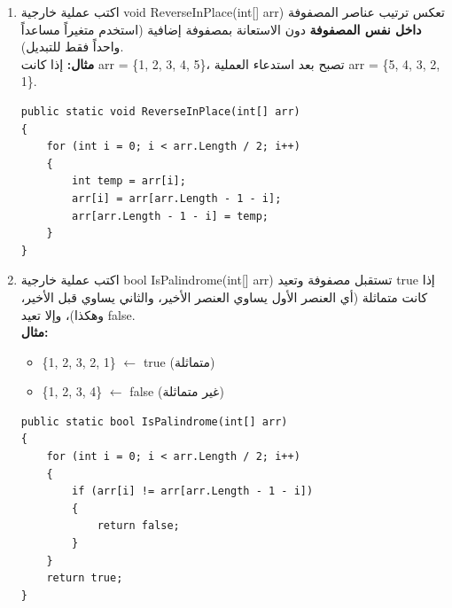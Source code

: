 \documentclass[14pt]{extarticle}
\begin{document}
\begin{enumerate}[resume, itemsep=2em]
\begin{boxSolution}
\begin{english}
\begin{verbatim}
    for (int i = arr.Length - 1; i >= 0; i--)
    {
        if (arr[i] % 2 == 0)
        {
            result[index] = arr[i];
            index++;
        }
    }

    return result;
}
    \end{verbatim}
    \end{english}
    \end{boxSolution}
    \fi

    \item
    اكتب عملية خارجية \textenglish{void ReverseInPlace(int[] arr)} تعكس ترتيب عناصر المصفوفة \textbf{داخل نفس المصفوفة} دون الاستعانة بمصفوفة إضافية (استخدم متغيراً مساعداً واحداً فقط للتبديل).\\
    \textbf{مثال:} إذا كانت \textenglish{arr = \{1, 2, 3, 4, 5\}}، تصبح بعد استدعاء العملية \textenglish{arr = \{5, 4, 3, 2, 1\}}.
    \ifwithsols
    \begin{boxSolution}
    \begin{english}
    \begin{verbatim}
public static void ReverseInPlace(int[] arr)
{
    for (int i = 0; i < arr.Length / 2; i++)
    {
        int temp = arr[i];
        arr[i] = arr[arr.Length - 1 - i];
        arr[arr.Length - 1 - i] = temp;
    }
}
    \end{verbatim}
    \end{english}
    \end{boxSolution}
    \fi

    \item
    اكتب عملية خارجية \textenglish{bool IsPalindrome(int[] arr)} تستقبل مصفوفة وتعيد \textenglish{true} إذا كانت متماثلة (أي العنصر الأول يساوي العنصر الأخير، والثاني يساوي قبل الأخير، وهكذا)، وإلا تعيد \textenglish{false}.\\
    \textbf{مثال:}
    \begin{itemize}
        \item \textenglish{\{1, 2, 3, 2, 1\}} $\leftarrow$ \textenglish{true} (متماثلة)
        \item \textenglish{\{1, 2, 3, 4\}} $\leftarrow$ \textenglish{false} (غير متماثلة)
    \end{itemize}
    \ifwithsols
    \begin{boxSolution}
    \begin{english}
    \begin{verbatim}
public static bool IsPalindrome(int[] arr)
{
    for (int i = 0; i < arr.Length / 2; i++)
    {
        if (arr[i] != arr[arr.Length - 1 - i])
        {
            return false;
        }
    }
    return true;
}
    \end{verbatim}
    \end{english}
    \end{boxSolution}
    \fi


\end{enumerate}
\end{document}
